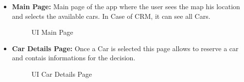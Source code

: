 \documentclass[a4paper]{article}
\begin{document}
\begin {itemize}
\item \textbf{Main Page:} Main page of the app where the user sees the map his location and selects the available cars. In Case of CRM, it can see all Cars.
\begin{figure}[h]
\centering
\vspace*{\fill}
\noindent{}%
\caption {UI Main Page}
\vspace*{0.2cm}
\end{figure}
\pagebreak
\item \textbf{Car Details Page:} Once a Car is selected this page allows to reserve a car and contais informations for the decision.
\begin{figure}[h!]
\centering
\vspace*{\fill}
\noindent{}%
\caption {UI Car Details Page}
\vspace*{0.2cm}
\end{figure}
\pagebreak



\end{itemize}
\end{document}

